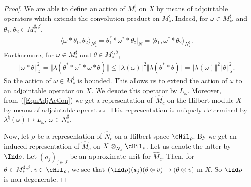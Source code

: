 \begin{proof}
We are able to def\/ine an action of $M_\ast^\sharp$ on $X$ by  means of adjointable operators which extends the convolution product on $M_\ast^\sharp$. Indeed, for $\omega\in M_\ast^\sharp$, and $\theta_1, \theta_2 \in M_\ast^{\sharp,\beta} $,
\begin{gather*}%
\langle \omega \ast \theta_1, \theta_2 \rangle_{N_\ast^\sharp} = \theta_1^\ast \ast \omega^\ast \ast \theta_2\vert_{N} =  \langle  \theta_1, \omega^\ast \ast \theta_2 \rangle_{N_\ast^\sharp}.
\end{gather*}
Furthermore, for $\omega \in M_\ast^\sharp$ and $\theta \in M_\ast^{\sharp, \beta}$,
\begin{gather}\label{EqnAdjAction}
\Vert \omega \ast \theta \Vert_X^2 = \Vert \lambda (\theta^\ast \ast \omega^\ast \ast \omega \ast \theta) \Vert \leq \Vert \lambda(\omega) \Vert^2 \Vert \lambda(\theta^\ast \ast \theta) \Vert = \Vert \lambda(\omega) \Vert^2 \Vert \theta\Vert_X^2.
\end{gather}
So the action of $\omega \in M_\ast^\sharp$ is bounded. This allows us to extend the action of $\omega$ to an adjointable operator on $X$. We denote this operator by $L_\omega$.  Moreover, from~(\ref{EqnAdjAction}) we get a representation of~$\hat{M}_c$ on the Hilbert module $X$ by means of adjointable operators. This representation is uniquely determined by $\lambda^\natural(\omega)   \mapsto L_\omega$, $\omega \in N_\ast^\sharp$.


Now, let $\rho$ be a representation of $\hat{N}_c$ on a Hilbert space $\cHil_\rho$. By  \cite[Proposition 2.66]{RaeWil} we get an induced representation of $\hat{M}_c$ on $X  \otimes_{\hat{N}_c} \cHil_\rho$. Let us denote the latter by~$\Ind \rho$. Let $(a_j)_{j \in J}$ be an approximate unit for $\hat{M}_c$. Then, for $\theta \in M_\ast^{\sharp, \beta}, v \in \cHil_\rho$, we see that $(\Ind \rho)(a_j) (\theta \otimes v) \rightarrow (\theta \otimes v)$ in $X$. So $\Ind \rho$ is non-degenerate.


\end{proof}
